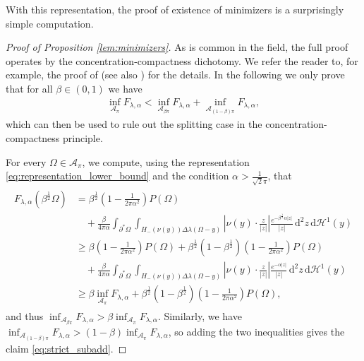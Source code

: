 \documentclass[11pt]{article}
\numberwithin{statement}{section}
\numberwithin{equation}{section}
\theoremstyle{remark}
\newcommand{\intd}{\, \mathrm{d}} 				%
\newcommand{\Hd}{\mathcal H}				%
\begin{document}
With this representation, the proof of existence of minimizers is a
surprisingly simple computation.

\begin{proof}[Proof of Proposition \ref{lem:minimizers}]
  As is common in the field, the full proof operates by the
  concentration-compactness dichotomy.  We refer the reader to, for
  example, the proof of \cite[Lemma 4.4]{muratov2018nonlocal} (see
  also \cite{knupfer2016low}) for the details.  In the
  following we only prove that for all $\beta \in (0,1)$ we have
	\begin{align}\label{eq:strict_subadd}
          \inf_{\mathcal{A_{\pi}}} F_{\lambda,\alpha} <
          \inf_{\mathcal{A_{\beta \pi}}} F_{\lambda,\alpha} +
          \inf_{\mathcal{A}_{(1-\beta) \pi}} F_{\lambda,\alpha}, 
	\end{align}
	which can then be used to rule out the splitting case in the
        concentration-compactness principle.
		
	For every $\Omega \in \mathcal A_{\pi}$, we compute, using the
        representation \eqref{eq:representation_lower_bound} and the
        condition $\alpha > \frac{1}{\sqrt 2 \pi}$, that
	\begin{align}
	  \begin{split}
            F_{\lambda,\alpha}\left(\beta^\frac{1}{2} \Omega\right)
            & =  \beta^\frac{1}{2} \left( 1- \frac{1}{2\pi
                \alpha^2}\right) P(\Omega)  \\ 
            &\quad + \frac{\beta}{4\pi \alpha} \int_{\partial^* \Omega}
            \int_{ H_-(\nu(y)) \Delta \lambda (\Omega - y) } \left|
              \nu(y) \cdot \frac{ z}{|z|} \right|
            \frac{e^{-\beta^{\frac{1}{2}}\alpha|z|}}{|z|} \intd^2 z
            \intd \Hd^1(y)\\ 
            &\geq \beta \left( 1- \frac{1}{2\pi \alpha^2}\right)
            P(\Omega) + \beta^\frac{1}{2} (1 - \beta^\frac{1}{2})
              \left( 1- \frac{1}{2\pi \alpha^2}\right) P(\Omega)   \\ 
            &\quad + \frac{\beta}{4\pi \alpha} \int_{\partial^* \Omega}
            \int_{ H_-(\nu(y)) \Delta \lambda (\Omega - y) } \left|
              \nu(y) \cdot \frac{ z}{|z|} \right|
            \frac{e^{-\alpha|z|}}{|z|} \intd^2 z \intd \Hd^1(y)\\
            & \geq \beta \inf_{\mathcal{A_{\pi}}} F_{\lambda,\alpha}
            + \beta^\frac{1}{2} (1 - \beta^\frac{1}{2}) \left( 1-
                \frac{1}{2\pi \alpha^2}\right) P(\Omega),
	  \end{split}
	\end{align}
	and thus
        $\inf_{\mathcal A_{\beta\pi}} F_{\lambda,\alpha}> \beta
        \inf_{\mathcal{A_{\pi}}} F_{\lambda,\alpha}$.  Similarly, we
        have
        $ \inf_{\mathcal A_{(1-\beta)\pi}} F_{\lambda,\alpha}>
        (1- \beta) \inf_{\mathcal{A_{\pi}}} F_{\lambda,\alpha}$, so
        adding the two inequalities gives the claim
        \eqref{eq:strict_subadd}.
        

\end{proof}
\end{document}
